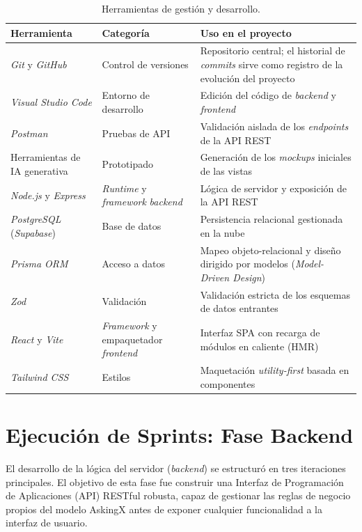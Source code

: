 \documentclass[11pt,oneside,spanish,listoffigures,listoftables]{tfgetsinf}
\begin{document}
\begin{table}[ht]
\centering
\caption[Herramientas de gestión y desarrollo]{Herramientas de gestión y desarrollo.}
\label{tab:herramientas}
\footnotesize
\renewcommand{\arraystretch}{1.3}
\begin{tabularx}{\textwidth}{%
  >{\raggedright\arraybackslash}p{3.2cm}%
  >{\raggedright\arraybackslash}p{3.2cm}%
  >{\raggedright\arraybackslash}X}
\toprule
\textbf{Herramienta} & \textbf{Categoría} & \textbf{Uso en el proyecto} \\
\midrule
\textit{Git} y \textit{GitHub} & Control de versiones & Repositorio central; el historial de \textit{commits} sirve como registro de la evolución del proyecto \\
\textit{Visual Studio Code} & Entorno de desarrollo & Edición del código de \textit{backend} y \textit{frontend} \\
\textit{Postman} & Pruebas de API & Validación aislada de los \textit{endpoints} de la API REST \\
Herramientas de IA generativa & Prototipado & Generación de los \textit{mockups} iniciales de las vistas \\
\textit{Node.js} y \textit{Express} & \textit{Runtime} y \textit{framework} \textit{backend} & Lógica de servidor y exposición de la API REST \\
\textit{PostgreSQL} (\textit{Supabase}) & Base de datos & Persistencia relacional gestionada en la nube \\
\textit{Prisma ORM} & Acceso a datos & Mapeo objeto-relacional y diseño dirigido por modelos (\textit{Model-Driven Design}) \\
\textit{Zod} & Validación & Validación estricta de los esquemas de datos entrantes \\
\textit{React} y \textit{Vite} & \textit{Framework} y empaquetador \textit{frontend} & Interfaz SPA con recarga de módulos en caliente (HMR) \\
\textit{Tailwind CSS} & Estilos & Maquetación \textit{utility-first} basada en componentes \\
\bottomrule
\end{tabularx}
\end{table}



\section{Ejecución de Sprints: Fase Backend}

El desarrollo de la lógica del servidor (\textit{backend}) se estructuró en tres iteraciones principales. El objetivo de esta fase fue construir una Interfaz de Programación de Aplicaciones (API) RESTful robusta, capaz de gestionar las reglas de negocio propios del modelo AskingX antes de exponer cualquier funcionalidad a la interfaz de usuario.
\end{document}
